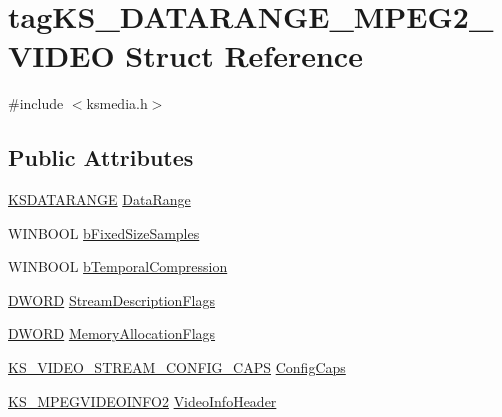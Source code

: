 \hypertarget{structtag_k_s___d_a_t_a_r_a_n_g_e___m_p_e_g2___v_i_d_e_o}{}\section{tag\+K\+S\+\_\+\+D\+A\+T\+A\+R\+A\+N\+G\+E\+\_\+\+M\+P\+E\+G2\+\_\+\+V\+I\+D\+EO Struct Reference}
\label{structtag_k_s___d_a_t_a_r_a_n_g_e___m_p_e_g2___v_i_d_e_o}


{\ttfamily \#include $<$ksmedia.\+h$>$}

\subsection*{Public Attributes}
\begin{DoxyCompactItemize}
\item 
\hyperlink{ks_8h_a1ea8bc535eaf96036403dc325623b469}{K\+S\+D\+A\+T\+A\+R\+A\+N\+GE} \hyperlink{structtag_k_s___d_a_t_a_r_a_n_g_e___m_p_e_g2___v_i_d_e_o_a963ad4b9fc504fe173436ec26bac6856}{Data\+Range}
\item 
W\+I\+N\+B\+O\+OL \hyperlink{structtag_k_s___d_a_t_a_r_a_n_g_e___m_p_e_g2___v_i_d_e_o_a9ee68bdb1015c8d7befe157d730805c6}{b\+Fixed\+Size\+Samples}
\item 
W\+I\+N\+B\+O\+OL \hyperlink{structtag_k_s___d_a_t_a_r_a_n_g_e___m_p_e_g2___v_i_d_e_o_af02eb7a58bb52b24d0b1c0d556221d09}{b\+Temporal\+Compression}
\item 
\hyperlink{mapinls_8h_ad342ac907eb044443153a22f964bf0af}{D\+W\+O\+RD} \hyperlink{structtag_k_s___d_a_t_a_r_a_n_g_e___m_p_e_g2___v_i_d_e_o_a899a4f138f1d3a25af1d204a228a0753}{Stream\+Description\+Flags}
\item 
\hyperlink{mapinls_8h_ad342ac907eb044443153a22f964bf0af}{D\+W\+O\+RD} \hyperlink{structtag_k_s___d_a_t_a_r_a_n_g_e___m_p_e_g2___v_i_d_e_o_ae6e4f0b1e96588f24202843987439304}{Memory\+Allocation\+Flags}
\item 
\hyperlink{ksmedia_8h_a6206e1a832fffa713842974c34128ade}{K\+S\+\_\+\+V\+I\+D\+E\+O\+\_\+\+S\+T\+R\+E\+A\+M\+\_\+\+C\+O\+N\+F\+I\+G\+\_\+\+C\+A\+PS} \hyperlink{structtag_k_s___d_a_t_a_r_a_n_g_e___m_p_e_g2___v_i_d_e_o_ac020b85011aadaf7b9bc7970d08e371f}{Config\+Caps}
\item 
\hyperlink{ksmedia_8h_abf42313fe7cfbb1c5227025d5feec1da}{K\+S\+\_\+\+M\+P\+E\+G\+V\+I\+D\+E\+O\+I\+N\+F\+O2} \hyperlink{structtag_k_s___d_a_t_a_r_a_n_g_e___m_p_e_g2___v_i_d_e_o_a0665d28c536b5b72ef423712cb4a247e}{Video\+Info\+Header}
\end{DoxyCompactItemize}


